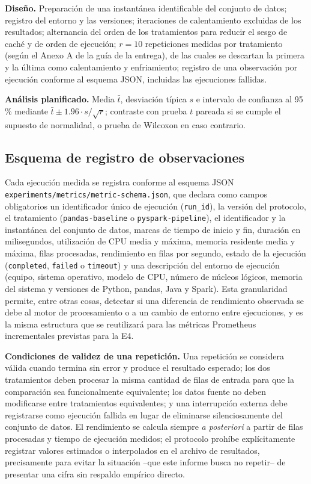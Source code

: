 \documentclass[10pt,twocolumn]{article}
\begin{document}
\textbf{Diseño.} Preparación de una instantánea identificable del conjunto
de datos; registro del entorno y las versiones; iteraciones de calentamiento
excluidas de los resultados; alternancia del orden de los tratamientos para
reducir el sesgo de caché y de orden de ejecución; $r=10$ repeticiones
medidas por tratamiento (según el Anexo A de la guía de la entrega), de las
cuales se descartan la primera y la última como calentamiento y
enfriamiento; registro de una observación por ejecución conforme al esquema
JSON, incluidas las ejecuciones fallidas.

\textbf{Análisis planificado.} Media $\bar t$, desviación típica $s$ e
intervalo de confianza al 95\,\% mediante
$\bar t \pm 1.96 \cdot s/\sqrt{r}$; contraste con prueba $t$ pareada si se
cumple el supuesto de normalidad, o prueba de Wilcoxon en caso contrario.

\subsection{Esquema de registro de observaciones}

Cada ejecución medida se registra conforme al esquema JSON
\texttt{experiments/metrics/metric-schema.json}, que declara como campos
obligatorios un identificador único de ejecución (\texttt{run\_id}), la
versión del protocolo, el tratamiento (\texttt{pandas-baseline} o
\texttt{pyspark-pipeline}), el identificador y la instantánea del conjunto
de datos, marcas de tiempo de inicio y fin, duración en milisegundos,
utilización de CPU media y máxima, memoria residente media y máxima, filas
procesadas, rendimiento en filas por segundo, estado de la ejecución
(\texttt{completed}, \texttt{failed} o \texttt{timeout}) y una descripción
del entorno de ejecución (equipo, sistema operativo, modelo de CPU, número
de núcleos lógicos, memoria del sistema y versiones de Python, pandas, Java
y Spark). Esta granularidad permite, entre otras cosas, detectar si una
diferencia de rendimiento observada se debe al motor de procesamiento o a
un cambio de entorno entre ejecuciones, y es la misma estructura que se
reutilizará para las métricas Prometheus incrementales previstas para la
E4.

\textbf{Condiciones de validez de una repetición.} Una repetición se
considera válida cuando termina sin error y produce el resultado esperado;
los dos tratamientos deben procesar la misma cantidad de filas de entrada
para que la comparación sea funcionalmente equivalente; los datos fuente no
deben modificarse entre tratamientos equivalentes; y una interrupción
externa debe registrarse como ejecución fallida en lugar de eliminarse
silenciosamente del conjunto de datos. El rendimiento se calcula siempre
\emph{a posteriori} a partir de filas procesadas y tiempo de ejecución
medidos; el protocolo prohíbe explícitamente registrar valores estimados o
interpolados en el archivo de resultados, precisamente para evitar la
situación --que este informe busca no repetir-- de presentar una cifra sin
respaldo empírico directo.
\end{document}
